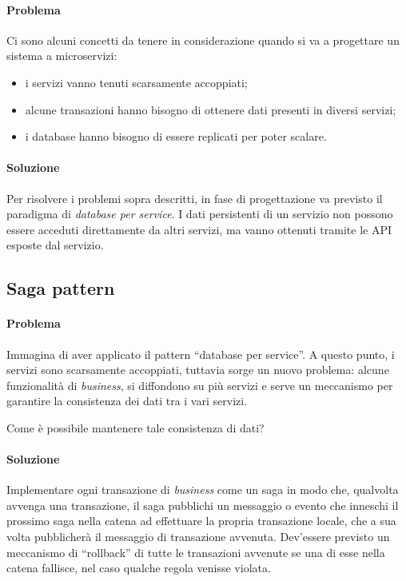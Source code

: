 \paragraph*{Problema} Ci sono alcuni concetti da tenere in considerazione quando si va a progettare un sistema a microservizi:
\begin{itemize}[noitemsep]
	\item i servizi vanno tenuti scarsamente accoppiati;
	\item alcune transazioni hanno bisogno di ottenere dati presenti in diversi servizi;
	\item i database hanno bisogno di essere replicati per poter scalare.
\end{itemize}

\paragraph*{Soluzione} Per risolvere i problemi sopra descritti, in fase di progettazione va previsto il paradigma di \textit{database per service}.
I dati persistenti di un servizio non possono essere acceduti direttamente da altri servizi, ma vanno ottenuti tramite le API esposte dal servizio.


\subsection{Saga pattern}

\paragraph*{Problema} Immagina di aver applicato il pattern ``database per service''.
A questo punto, i servizi sono scarsamente accoppiati, tuttavia sorge un nuovo problema: alcune funzionalità di \textit{business}, si diffondono su più servizi e serve un meccanismo per garantire la consistenza dei dati
tra i vari servizi. 

Come è possibile mantenere tale consistenza di dati?

\paragraph*{Soluzione} Implementare ogni transazione di \textit{business} come un saga in modo che, qualvolta avvenga una transazione, il saga pubblichi un messaggio o evento che inneschi il prossimo saga nella catena ad effettuare la propria transazione locale, che a sua volta pubblicherà il messaggio di transazione avvenuta.
Dev'essere previsto un meccanismo di ``rollback'' di tutte le transazioni avvenute se una di esse nella catena fallisce, nel caso qualche regola venisse violata.

